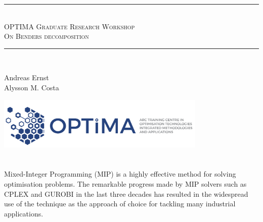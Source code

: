 
\usepackage{pgfplots}
\pgfplotsset{compat=1.16}
\usepackage{booktabs}








\begin{titlepage}

\begin{center}

\vfill

\rule{\linewidth}{0.5mm} \\[0.4cm]
\textsc{\Large OPTIMA Graduate Research Workshop \\[0.4cm] On  Benders decomposition }
\rule{\linewidth}{0.5mm} \\[1.5cm]

\end{center}

{\large 
\noindent Andreas Ernst\\[.3cm]
\noindent Alysson M. Costa\\
}

\vfill 

\includegraphics[width=10cm]{fig/optima.png}

\vspace{2cm}

\end{titlepage}


\section*{}

\vfill

Mixed-Integer Programming (MIP) is a highly effective method for solving optimisation problems. The remarkable progress made by MIP solvers such as CPLEX and GUROBI in the last three decades has resulted in the widespread use of the technique as the approach of choice for tackling many industrial applications.

